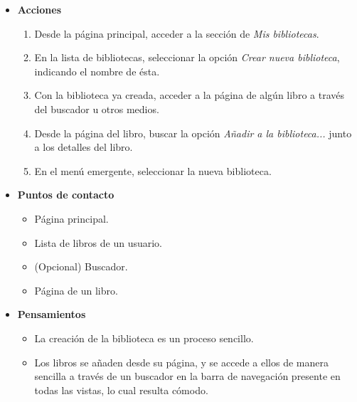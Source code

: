 \begin{itemize}
    \item \textbf{Acciones}
    \begin{enumerate}
        \item Desde la página principal, acceder a la sección de \textit{Mis bibliotecas}.
        \item En la lista de bibliotecas, seleccionar la opción \textit{Crear nueva biblioteca}, indicando el nombre de ésta.
        \item Con la biblioteca ya creada, acceder a la página de algún libro a través del buscador u otros medios.
        \item Desde la página del libro, buscar la opción \textit{Añadir a la biblioteca...} junto a los detalles del libro.
        \item En el menú emergente, seleccionar la nueva biblioteca.
    \end{enumerate}
\item \textbf{Puntos de contacto}
    \begin{itemize}
        \item Página principal.
        \item Lista de libros de un usuario.
        \item (Opcional) Buscador.
        \item Página de un libro.
    \end{itemize}
\item \textbf{Pensamientos}
    \begin{itemize}
        \item La creación de la biblioteca es un proceso sencillo.
        \item Los libros se añaden desde su página, y se accede a ellos de manera sencilla a través de un buscador en la barra de navegación presente en todas las vistas, lo cual resulta cómodo.
    \end{itemize}
\end{itemize}

